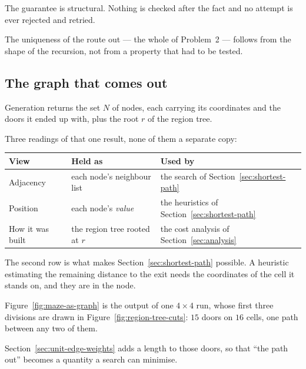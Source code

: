 The guarantee is structural. Nothing is checked after the fact and no attempt is
ever rejected and retried.

The uniqueness of the route out --- the whole of Problem~2 --- follows from the
shape of the recursion, not from a property that had to be tested.

\subsection{The graph that comes out}

Generation returns the set $N$ of nodes, each carrying its coordinates and the
doors it ended up with, plus the root $r$ of the region tree.

Three readings of that one result, none of them a separate copy:

\begin{center}
\begin{tabular}{@{}lll@{}}
  \toprule
  View & Held as & Used by \\
  \midrule
  Adjacency          & each node's neighbour list
                     & the search of Section~\ref{sec:shortest-path} \\
  Position           & each node's \textit{value}
                     & the heuristics of Section~\ref{sec:shortest-path} \\
  How it was built   & the region tree rooted at $r$
                     & the cost analysis of Section~\ref{sec:analysis} \\
  \bottomrule
\end{tabular}
\end{center}

The second row is what makes Section~\ref{sec:shortest-path} possible. A
heuristic estimating the remaining distance to the exit needs the coordinates of
the cell it stands on, and they are in the node.

Figure~\ref{fig:maze-as-graph} is the output of one $4\times4$ run, whose first
three divisions are drawn in Figure~\ref{fig:region-tree-cuts}: $15$ doors on
$16$ cells, one path between any two of them.

Section~\ref{sec:unit-edge-weights} adds a length to those doors, so that ``the
path out'' becomes a quantity a search can minimise.
